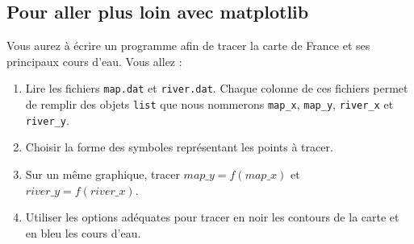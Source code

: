\subsection{Pour aller plus loin avec matplotlib {\sc [Facultatif]}}

Vous aurez à écrire un programme afin de tracer la carte de France et ses principaux cours d'eau.
Vous allez : 

\begin{enumerate}
\item Lire les fichiers \texttt{map.dat} et \texttt{river.dat}. Chaque colonne de ces fichiers permet de remplir des objets \texttt{list} que nous nommerons
  \texttt{map\_x},  \texttt{map\_y},  \texttt{river\_x} et \texttt{river\_y}.
\item Choisir la forme des  symboles représentant les points à tracer.

\item Sur un même graphique, tracer $map\_y = f(map\_x)$ et $river\_y = f(river\_x)$.

\item Utiliser les options adéquates pour tracer en noir les contours de la carte et en bleu les cours d'eau.


\end{enumerate}




\vfill
